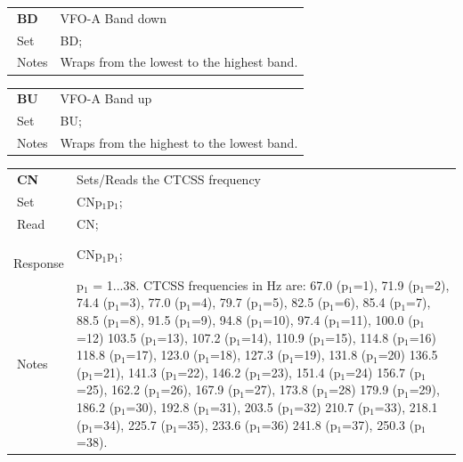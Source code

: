 \documentclass[12pt]{book}
\begin{document}
\begin{center}
\begin{tabular}{|p{2cm}|p{11cm}|}
\toprule
$\phantom{\Big|}$\textbf{\large BD} & VFO-A Band down \\\cline{1-2}
$\phantom{\Big|}${\large Set} & {BD;} \\\hline
$\phantom{\Big|}${\large Notes} & \multicolumn{1}{|p{11cm}|}{Wraps from the lowest to the highest band.} \\
\bottomrule
\end{tabular}
\end{center}

\begin{center}
\begin{tabular}{|p{2cm}|p{11cm}|}
\toprule
$\phantom{\Big|}$\textbf{\large BU} & VFO-A Band up \\\cline{1-2}
$\phantom{\Big|}${\large Set} & {BU;} \\\hline
$\phantom{\Big|}${\large Notes} & \multicolumn{1}{|p{11cm}|}{Wraps from the highest to the lowest band.} \\
\bottomrule
\end{tabular}
\end{center}

\begin{center}
\begin{tabular}{|p{2cm}|p{11cm}|}
\toprule
$\phantom{\Big|}$\textbf{\large CN} & Sets/Reads the CTCSS frequency \\\cline{1-2}
$\phantom{\Big|}${\large Set} & {CNp$_1$p$_1$;} \\\hline
$\phantom{\Big|}${\large Read} & {CN;} \\\hline
$\phantom{\Big|}${\large Response} & {CNp$_1$p$_1$;} \\\hline
$\phantom{\Big|}${\large Notes} & \multicolumn{1}{|p{11cm}|}{p$_1$ =  1...38. CTCSS frequencies in Hz are: 67.0 (p$_1$=1),  71.9 (p$_1$=2),  74.4 (p$_1$=3),  77.0 (p$_1$=4), 79.7 (p$_1$=5),  82.5 (p$_1$=6),  85.4 (p$_1$=7),  88.5 (p$_1$=8), 91.5 (p$_1$=9),  94.8 (p$_1$=10), 97.4 (p$_1$=11), 100.0 (p$_1$=12) 103.5 (p$_1$=13), 107.2 (p$_1$=14), 110.9 (p$_1$=15), 114.8 (p$_1$=16) 118.8 (p$_1$=17), 123.0 (p$_1$=18), 127.3 (p$_1$=19), 131.8 (p$_1$=20) 136.5 (p$_1$=21), 141.3 (p$_1$=22), 146.2 (p$_1$=23), 151.4 (p$_1$=24) 156.7 (p$_1$=25), 162.2 (p$_1$=26), 167.9 (p$_1$=27), 173.8 (p$_1$=28) 179.9 (p$_1$=29), 186.2 (p$_1$=30), 192.8 (p$_1$=31), 203.5 (p$_1$=32) 210.7 (p$_1$=33), 218.1 (p$_1$=34), 225.7 (p$_1$=35), 233.6 (p$_1$=36) 241.8 (p$_1$=37), 250.3 (p$_1$=38).} \\
\bottomrule
\end{tabular}
\end{center}
\end{document}
